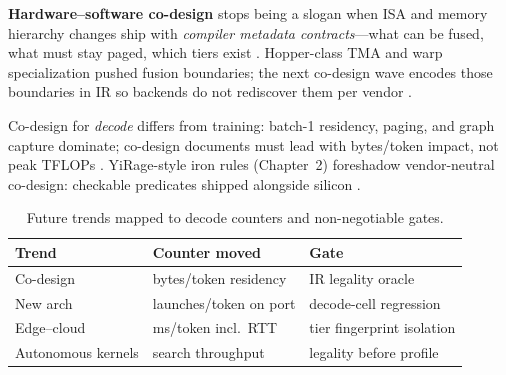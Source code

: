 \textbf{Hardware--software co-design} stops being a slogan when ISA and memory hierarchy changes ship with \emph{compiler metadata contracts}---what can be fused, what must stay paged, which tiers exist \citep{chen2020compilerbasedhardw,yirage2026,semianalysis2024tma,amd2024xdna,amd2024aie,patel2025llminference,kwon2023vllm,liu2024deepseekv3,memoryfloor2026,taxbreak2026,dlbook,dao2022flashattention,dao2023flashdecoding,nvidia2024cudagraphs,nvidia2022hopper}. Hopper-class TMA and warp specialization pushed fusion boundaries; the next co-design wave encodes those boundaries in IR so backends do not rediscover them per vendor \citep{nvidia2022hopper,semianalysis2024tma,yirage2026,chen2020compilerbasedhardw,patel2025llminference,kwon2023vllm,liu2024deepseekv3,memoryfloor2026,taxbreak2026,amd2024aie,dlbook,dao2022flashattention,dao2023flashdecoding,nvidia2024cudagraphs,nvidia2022hopper,amd2024xdna}.

Co-design for \emph{decode} differs from training: batch-1 residency, paging, and graph capture dominate; co-design documents must lead with bytes/token impact, not peak TFLOPs \citep{patel2025llminference,memoryfloor2026,taxbreak2026,dao2022flashattention,kwon2023vllm,yirage2026,chen2020compilerbasedhardw,liu2024deepseekv3,amd2024aie,dlbook,semianalysis2024tma,amd2024xdna,dao2023flashdecoding,nvidia2024cudagraphs,nvidia2022hopper}. YiRage-style iron rules (Chapter~2) foreshadow vendor-neutral co-design: checkable predicates shipped alongside silicon \citep{yirage2026,chen2020compilerbasedhardw,kwon2023vllm,patel2025llminference,liu2024deepseekv3,memoryfloor2026,taxbreak2026,amd2024aie,dlbook,semianalysis2024tma,amd2024xdna,dao2022flashattention,dao2023flashdecoding,nvidia2024cudagraphs,nvidia2022hopper}.

\begin{table}[t]
\centering
\small
\begin{tabular}{@{}lll@{}}
\toprule
\textbf{Trend} & \textbf{Counter moved} & \textbf{Gate} \\
\midrule
Co-design & bytes/token residency & IR legality oracle \\
New arch & launches/token on port & decode-cell regression \\
Edge--cloud & ms/token incl.\ RTT & tier fingerprint isolation \\
Autonomous kernels & search throughput & legality before profile \\
\bottomrule
\end{tabular}
\caption{Future trends mapped to decode counters and non-negotiable gates.}
\label{tab:ch27_trend_gates}
\end{table}

